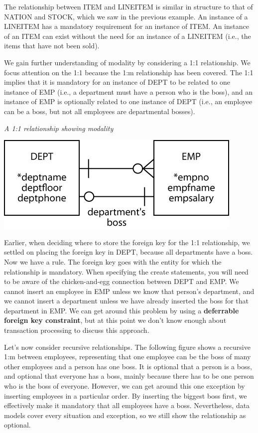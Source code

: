 \documentclass[
]{article}
\begin{document}
The relationship between ITEM and LINEITEM is similar in structure to
that of NATION and STOCK, which we saw in the previous example. An
instance of a LINEITEM has a mandatory requirement for an instance of
ITEM. An instance of an ITEM can exist without the need for an instance
of a LINEITEM (i.e., the items that have not been sold).

We gain further understanding of modality by considering a 1:1
relationship. We focus attention on the 1:1 because the 1:m relationship
has been covered. The 1:1 implies that it is mandatory for an instance
of DEPT to be related to one instance of EMP (i.e., a department must
have a person who is the boss), and an instance of EMP is optionally
related to one instance of DEPT (i.e., an employee can be a boss, but
not all employees are departmental bosses).

\emph{A 1:1 relationship showing modality}

\includegraphics{Figures/Chapter 7/1-and-1-modality.png}

Earlier, when deciding where to store the foreign key for the 1:1
relationship, we settled on placing the foreign key in DEPT, because all
departments have a boss. Now we have a rule. The foreign key goes with
the entity for which the relationship is mandatory. When specifying the
create statements, you will need to be aware of the chicken-and-egg
connection between DEPT and EMP. We cannot insert an employee in EMP
unless we know that person's department, and we cannot insert a
department unless we have already inserted the boss for that department
in EMP. We can get around this problem by using a \textbf{deferrable foreign
key constraint}, but at this point we don't know enough about
transaction processing to discuss this approach.

Let's now consider recursive relationships. The following figure shows a
recursive 1:m between employees, representing that one employee can be
the boss of many other employees and a person has one boss. It is
optional that a person is a boss, and optional that everyone has a boss,
mainly because there has to be one person who is the boss of everyone.
However, we can get around this one exception by inserting employees in
a particular order. By inserting the biggest boss first, we effectively
make it mandatory that all employees have a boss. Nevertheless, data
models cover every situation and exception, so we still show the
relationship as optional.
\end{document}
